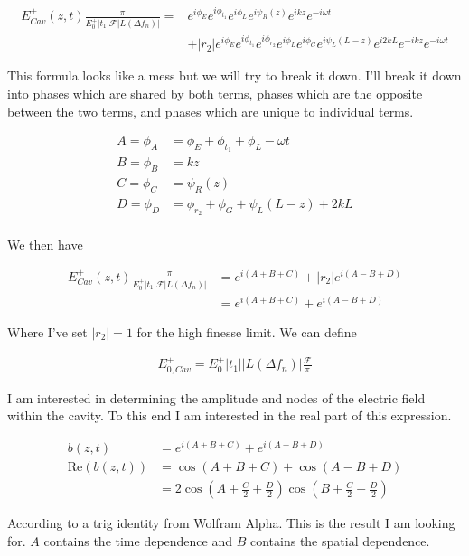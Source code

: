\documentclass[12pt]{article}
\begin{document}
\begin{align}
E_{Cav}^+(z,t) \frac{\pi}{E_0^+|t_1| \mathcal{F} |L(\Delta f_n)|} =& e^{i\phi_E}e^{i\phi_{t_1}} e^{i\phi_L} e^{i\psi_R(z)} e^{ikz} e^{-i\omega t} \\
&+  |r_2|e^{i\phi_E}e^{i\phi_{t_1}}e^{i\phi_{r_2}} e^{i\phi_L} e^{i\phi_G} e^{i \psi_L(L-z)}e^{i2kL}e^{-ikz} e^{-i\omega t}
\end{align}

This formula looks like a mess but we will try to break it down. I'll break it down into phases which are shared by both terms, phases which are the opposite between the two terms, and phases which are unique to individual terms.

\begin{align}
A = \phi_A &= \phi_E + \phi_{t_1} + \phi_L - \omega t\\
B = \phi_B &= kz\\
C = \phi_C &= \psi_R(z)\\
D = \phi_D &= \phi_{r_2} + \phi_G + \psi_L(L-z) + 2kL\\
\end{align}

We then have

\begin{align}
E_{Cav}^+(z,t) \frac{\pi}{E_0^+|t_1| \mathcal{F} |L(\Delta f_n)|} &= e^{i(A+B+C)} + |r_2| e^{i(A-B+D)}\\
&=e^{i(A+B+C)} + e^{i(A-B+D)}
\end{align}

Where I've set $|r_2|=1$ for the high finesse limit. We can define

\begin{align}
E_{0,Cav}^+ = E_0^+ |t_1| |L(\Delta f_n)| \frac{\mathcal{F}}{\pi}
\end{align}


I am interested in determining the amplitude and nodes of the electric field within the cavity. To this end I am interested in the real part of this expression.

\begin{align}
b(z,t) &= e^{i(A+B+C)} + e^{i(A-B+D)}\\
\text{Re}(b(z,t)) &= \cos(A+B+C) + \cos(A-B+D)\\
&= 2\cos\left(A + \frac{C}{2} + \frac{D}{2} \right) \cos\left(B+\frac{C}{2}-\frac{D}{2}\right)
\end{align}

According to a trig identity from Wolfram Alpha. This is the result I am looking for. $A$ contains the time dependence and $B$ contains the spatial dependence.
\end{document}
